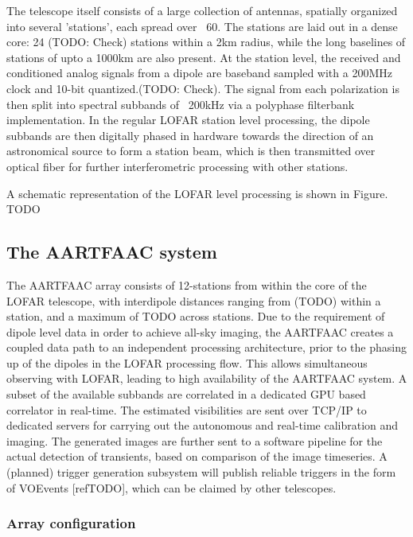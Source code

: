 \documentclass{aa}
\begin{document}
The  telescope itself  consists of  a  large collection  of antennas,  spatially
organized into several  'stations', each spread over ~60. The  stations are laid
out in a  dense core: 24 (TODO:  Check) stations within a 2km  radius, while the
long baselines  of stations of  upto a 1000km are  also present. At  the station
level, the  received and conditioned analog  signals from a dipole  are baseband
sampled with a 200MHz clock and  10-bit quantized.(TODO: Check). The signal from
each  polarization  is then  split  into  spectral  subbands  of ~200kHz  via  a
polyphase  filterbank  implementation.   In  the  regular  LOFAR  station  level
processing, the  dipole subbands are  then digitally phased in  hardware towards
the direction of  an astronomical source to  form a station beam,  which is then
transmitted over optical fiber for further interferometric processing with other
stations.

A  schematic  representation   of  the  LOFAR  level  processing   is  shown  in
Figure. TODO

\subsection {\label{subsec:aartfaac}  The AARTFAAC system}
The AARTFAAC  array consists of  12-stations from within  the core of  the LOFAR
telescope, with interdipole distances ranging  from (TODO) within a station, and
a maximum of TODO across stations.  Due  to the requirement of dipole level data
in order to achieve all-sky imaging, the AARTFAAC creates a coupled data path to
an independent processing  architecture, prior to the phasing up  of the dipoles
in the  LOFAR processing  flow. This allows  simultaneous observing  with LOFAR,
leading to high  availability of the AARTFAAC system. A  subset of the available
subbands are  correlated in a dedicated  GPU based correlator in  real-time. The
estimated visibilities  are sent over  TCP/IP to dedicated servers  for carrying
out the autonomous and real-time  calibration and imaging.  The generated images
are further sent to a software  pipeline for the actual detection of transients,
based  on comparison  of the  image timeseries.  A (planned)  trigger generation
subsystem  will publish  reliable triggers  in the  form of  VOEvents [refTODO],
which can be claimed by other telescopes.

\subsubsection {\label{subsubsec:arrayconf} Array configuration}
\end{document}
